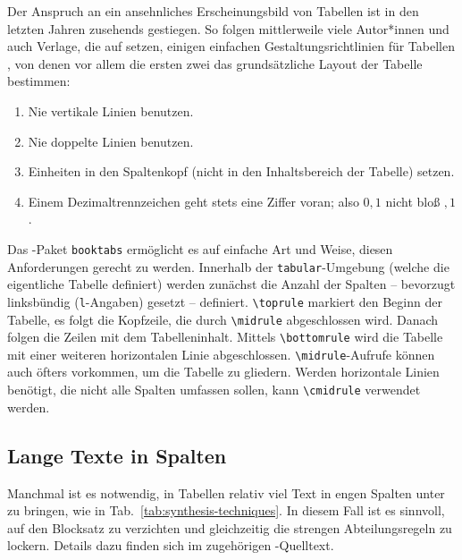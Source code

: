 Der Anspruch an ein ansehnliches Erscheinungsbild von Tabellen ist in den
letzten Jahren zusehends gestiegen. So folgen mittlerweile viele Autor*innen
und auch Verlage, die auf \latex setzen, einigen einfachen
Gestaltungsrichtlinien für Tabellen \cite{Fear2020}, von denen vor allem die
ersten zwei das grundsätzliche Layout der Tabelle bestimmen:

\begin{enumerate}
	\item Nie vertikale Linien benutzen.
	\item Nie doppelte Linien benutzen.
	\item Einheiten in den Spaltenkopf (nicht in den Inhaltsbereich der
	Tabelle) setzen.
	\item Einem Dezimaltrennzeichen geht stets eine Ziffer voran; also $0{,}1$
	nicht bloß ${,}1$.
\end{enumerate}

Das \latex-Paket \texttt{booktabs} ermöglicht es auf einfache Art und Weise,
diesen Anforderungen gerecht zu werden. Innerhalb der
\texttt{tabular}-Umgebung (welche die eigentliche Tabelle definiert) werden
zunächst die Anzahl der Spalten -- bevorzugt linksbündig (\texttt{l}-Angaben)
gesetzt -- definiert. \verb|\toprule| markiert den Beginn der Tabelle, es
folgt die Kopfzeile, die durch \verb|\midrule| abgeschlossen wird. Danach
folgen die Zeilen mit dem Tabelleninhalt. Mittels \verb|\bottomrule| wird die
Tabelle mit einer weiteren horizontalen Linie abgeschlossen.
\verb|\midrule|-Aufrufe können auch öfters vorkommen, um die Tabelle zu
gliedern. Werden horizontale Linien benötigt, die nicht alle Spalten umfassen
sollen, kann \verb|\cmidrule| verwendet werden.

\subsection{Lange Texte in Spalten}

Manchmal ist es notwendig, in Tabellen relativ viel Text in engen Spalten
unter zu bringen, wie in Tab.~\ref{tab:synthesis-techniques}. In diesem Fall
ist es sinnvoll, auf den Blocksatz zu verzichten und gleichzeitig die
strengen Abteilungsregeln zu lockern. Details dazu finden sich im zugehörigen
\latex-Quelltext.


